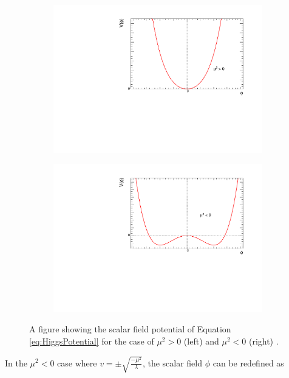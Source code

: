 \documentclass[12pt,a4paper,epsf,portrait,times,epsfig]{report}
\begin{document}
	\begin{figure}[ht]
		\begin{subfigure}{.48\textwidth}
			\centering
			\includegraphics[scale=0.38]{HiggsPot_muEven.pdf}
			\label{Fig:HiggsPot_muEven}
		\end{subfigure}
		\begin{subfigure}{.48\textwidth}
			\centering
			\includegraphics[scale=0.38]{HiggsPot_muOdd.pdf}
			\label{Fig:HiggsPot_muOdd}
		\end{subfigure}
		\caption{A figure showing the scalar field potential of Equation \ref{eq:HiggsPotential} for the case of $\mu^2 > 0$ (left) and $\mu^2 < 0$ (right) \cite{AntonyFrayThesis}.}
		\label{Fig:HiggsPotential} 
	\end{figure}

	In the $\mu^2 < 0$ case where $v = \pm \sqrt{\frac{-\mu^{2}}{\lambda}}$, the scalar field $\phi$ can be redefined as
\end{document}
